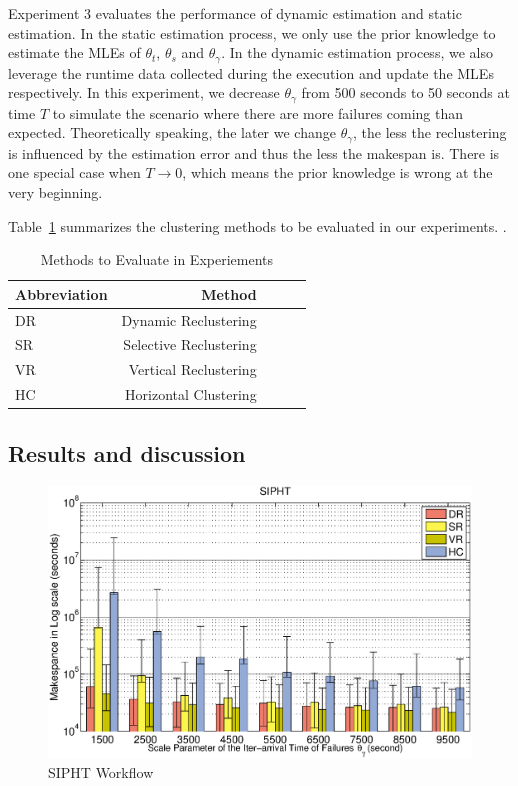 \documentclass{IOS-Book-Article}
\begin{document}
Experiment 3 evaluates the performance of dynamic estimation and static estimation. In the static estimation process, we only use the prior knowledge to estimate the MLEs of $\theta_t$, $\theta_s$ and $\theta_{\gamma}$. In the dynamic estimation process, we also leverage the runtime data collected during the execution and update the MLEs respectively. In this experiment, we decrease $\theta_{\gamma}$ from 500 seconds to 50 seconds at time $T$ to simulate the scenario where there are more failures coming than expected. Theoretically speaking, the later we change $\theta_{\gamma}$, the less the reclustering is influenced by the estimation error and thus the less the makespan is. There is one special case when $T\to 0$, which means the prior knowledge is wrong at the very beginning. 

Table~\ref{tab:evaluation_methods} summarizes the clustering methods to be evaluated in our experiments. . 
\begin{table}[!htb]
	\centering
	\small
	\begin{tabular}{l|rrrr}
		\hline
		Abbreviation	& Method	  \\
		\hline
		DR 		& Dynamic Reclustering		\\
		SR 		&Selective Reclustering\\
		VR 	&Vertical Reclustering\\
		HC 	&Horizontal Clustering \\
		\hline
	\end{tabular}
	\caption{Methods to Evaluate in Experiements}
	\label{tab:evaluation_methods}
\end{table} 


\subsection{Results and discussion}
\label{sec:results}

\begin{figure}[!htb]
\centering
  \includegraphics[width=1\linewidth]{sipht.eps}
  \caption{SIPHT Workflow}
  \label{fig:expr_sipht}
\end{figure}
\end{document}
